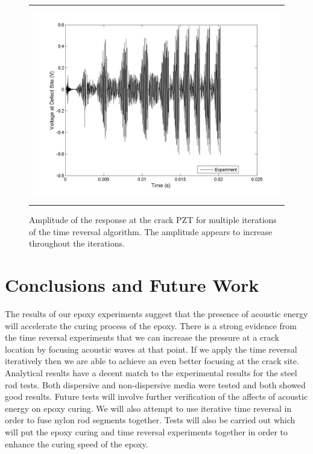 \documentclass[a4paper]{spie}  %
\begin{document}
\begin{figure}[h!]
\begin{center}
\begin{tabular}{c}
\includegraphics[height=8.5cm]{epoxy_tr}
\end{tabular}
\end{center}
\caption[example] 
{ \label{fig:epoxy_tr} 
   Amplitude of the response at the crack PZT for multiple iterations of the time reversal algorithm. The amplitude appears to increase throughout the iterations.
}
\end{figure} 


\section{Conclusions and Future Work}
The results of our epoxy experiments suggest that the presence of acoustic energy will accelerate the curing process of the epoxy. There is a strong evidence from the time reversal experiments that we can increase the pressure at a crack location by focusing acoustic waves at that point. If we apply the time reversal iteratively then we are able to achieve an even better focusing at the crack site. Analytical results have a decent match to the experimental results for the steel rod tests. Both dispersive and non-dispersive media were tested and both showed good results. Future tests will involve further verification of the affects of acoustic energy on epoxy curing. We will also attempt to use iterative time reversal in order to fuse nylon rod segments together. Tests will also be carried out which will put the epoxy curing and time reversal experiments together in order to enhance the curing speed of the epoxy.
\end{document}
